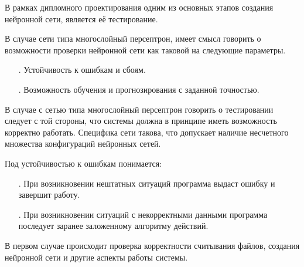 {\gostFont
	
	\par \redline В рамках дипломного проектирования одним из основных этапов создания нейронной сети, является её тестирование.  
	
	\par \redline В случае сети типа многослойный персептрон, имеет смысл говорить о возможности проверки нейронной сети как таковой на следующие параметры. 
	
	\begin{itemize}[leftmargin=2.15cm, labelwidth=0.65cm, labelsep=0.0cm] 
		
		\item[\theitemcntr. ] Устойчивость к ошибкам и сбоям.
		\addtocounter{itemcntr}{1}
		
		\item[\theitemcntr. ] Возможность обучения и прогнозирования с заданной точностью.
		\addtocounter{itemcntr}{1}
		
		\setcounter{itemcntr}{1}
	\end{itemize}
	
	\par \redline В случае с сетью типа многослойный персептрон говорить о тестировании следует с той стороны, что системы должна в принципе иметь возможность корректно работать. Специфика сети такова, что допускает наличие несчетного множества конфигураций нейронных сетей. 
	
	\par \redline Под устойчивостью к ошибкам понимается:
	
	\begin{itemize}[leftmargin=2.15cm, labelwidth=0.65cm, labelsep=0.0cm] 
		
		\item[\theitemcntr. ]  При возникновении нештатных ситуаций программа выдаст ошибку и завершит работу.
		\addtocounter{itemcntr}{1}
		
		\item[\theitemcntr. ] При возникновении ситуаций с некорректными данными программа последует заранее заложенному алгоритму действий.
		\addtocounter{itemcntr}{1}
		
		\setcounter{itemcntr}{1}
	\end{itemize}  
	
	\par \redline В первом случае происходит проверка корректности считывания файлов, создания нейронной сети и другие аспекты работы системы. 
	
}
